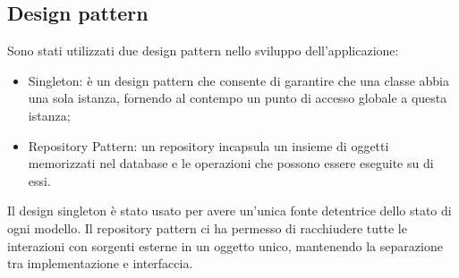 \clearpage

\subsection{Design pattern}

Sono stati utilizzati due design pattern nello sviluppo dell'applicazione:
\begin{itemize}
    \item Singleton: è un design pattern che consente di garantire che una classe abbia una sola istanza, fornendo al contempo un punto di accesso globale a questa istanza;
    \item Repository Pattern: un repository incapsula un insieme di oggetti memorizzati nel database e le operazioni che possono essere eseguite su di essi.
\end{itemize}

Il design singleton è stato usato per avere un'unica fonte detentrice dello stato di ogni modello.
Il repository pattern ci ha permesso di racchiudere tutte le interazioni con sorgenti esterne in un oggetto unico, mantenendo la separazione tra implementazione e interfaccia.


